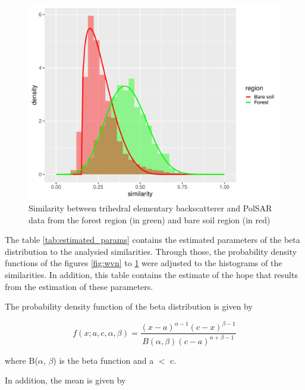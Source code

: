 \documentclass[conference]{IEEEtran}
\begin{document}
\begin{figure}[!ht]
    \centering
    \includegraphics[width = .9\linewidth, height = .7\linewidth]{../../../Figures/paper_19_05/tr.pdf}
    \caption{Similarity between trihedral elementary backscatterer and PolSAR data from the forest region (in green) and bare soil region (in red)}
    \label{fig:tr}
\end{figure}

The table \ref{tab:estimated_params} contains the estimated parameters of the beta distribution to the analysied similarities. Through those, the probability density functions of the figures \ref{fig:wvn} to \ref{fig:tr} were adjusted to the histograms of the similarities. In addition, this table contains the estimate of the hope that results from the estimation of these parameters.

The probability density function of the beta distribution is given by

\begin{equation}
  f(x; a, c, \alpha, \beta) = \frac{(x - a)^{\alpha-1} (c - x)^{\beta - 1}}{B(\alpha, \beta) (c - a)^{\alpha + \beta - 1}}
\end{equation}

where B($\alpha$, $\beta$) is the beta function and a $<$ c.

In addition, the mean is given by
\end{document}
